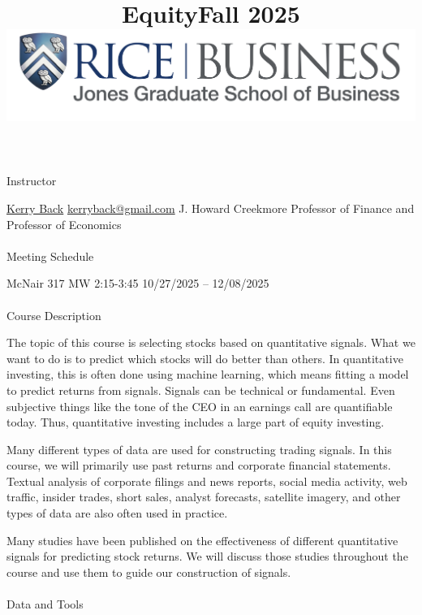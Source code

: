 \documentclass[
  letterpaper,
  DIV=11,
  numbers=noendperiod]{scrartcl}
\title{EquityFall
2025\includegraphics[width=0.4\linewidth,height=\textheight,keepaspectratio]{images/RiceBusiness-transparent-logo-sm.png}}
\author{}
\date{}
\makeatletter
\let\oldparagraph\paragraph
\renewcommand{\paragraph}{
    \@ifstar
      \xxxParagraphStar
      \xxxParagraphNoStar
  }
\newcommand{\xxxParagraphStar}[1]{\oldparagraph*{#1}\mbox{}}
\newcommand{\xxxParagraphNoStar}[1]{\oldparagraph{#1}\mbox{}}
\makeatother
\begin{document}
\maketitle


\paragraph{Instructor}\label{instructor}

\href{https://kerryback.com}{Kerry Back}
\href{mailto:\%20kerryback@gmail.com}{kerryback@gmail.com} J. Howard
Creekmore Professor of Finance and Professor of Economics

\paragraph{Meeting Schedule}\label{meeting-schedule}

McNair 317 MW 2:15-3:45 10/27/2025 -- 12/08/2025

\paragraph{Course Description}\label{course-description}

The topic of this course is selecting stocks based on quantitative
signals. What we want to do is to predict which stocks will do better
than others. In quantitative investing, this is often done using machine
learning, which means fitting a model to predict returns from signals.
Signals can be technical or fundamental. Even subjective things like the
tone of the CEO in an earnings call are quantifiable today. Thus,
quantitative investing includes a large part of equity investing.

Many different types of data are used for constructing trading signals.
In this course, we will primarily use past returns and corporate
financial statements. Textual analysis of corporate filings and news
reports, social media activity, web traffic, insider trades, short
sales, analyst forecasts, satellite imagery, and other types of data are
also often used in practice.

Many studies have been published on the effectiveness of different
quantitative signals for predicting stock returns. We will discuss those
studies throughout the course and use them to guide our construction of
signals.

\paragraph{Data and Tools}\label{data-and-tools}
\end{document}
